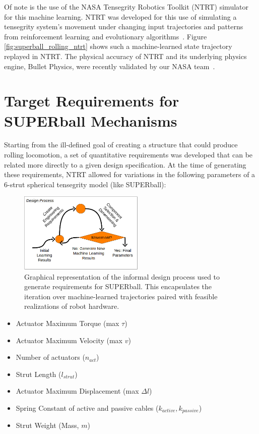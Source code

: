 \documentclass[12pt]{report}
\begin{document}
Of note is the use of the NASA Tensegrity Robotics Toolkit (NTRT) simulator for this machine learning. 
NTRT was developed for this use of simulating a tensegrity system's movement under changing input trajectories and patterns from reinforcement learning and evolutionary algorithms~\cite{Tietz2013,mirletz2014design,Caluwaerts2013rsif,Iscen2013,iscen2014flop}.
Figure \ref{fig:superball_rolling_ntrt} shows such a machine-learned state trajectory replayed in NTRT.
The physical accuracy of NTRT and its underlying physics engine, Bullet Physics, were recently validated by our NASA team~\cite{Caluwaerts2013rsif}.

\section{Target Requirements for SUPERball Mechanisms}

Starting from the ill-defined goal of creating a structure that could produce rolling locomotion, a set of quantitative requirements was developed that can be related more directly to a given design specification.
At the time of generating these requirements, NTRT allowed for variations in the following parameters of a 6-strut spherical tensegrity model (like SUPERball):

\begin{figure}
  \begin{center}
  \vspace{-0.5cm}
    \includegraphics[width=0.53\textwidth]{img/design_process.jpg}
    \caption{Graphical representation of the informal design process used to generate requirements for SUPERball. This encapsulates the iteration over machine-learned trajectories paired with feasible realizations of robot hardware.}
    \label{fig:design_process}
  \end{center}
  \vspace{-0.7cm}
\end{figure}

\begin{itemize}
  \setlength{\itemsep}{0cm}%
  \setlength{\parskip}{0cm}%
  \item Actuator Maximum Torque (max $\tau$)
  \item Actuator Maximum Velocity (max $v$)
  \item Number of actuators ($n_{act}$)
  \item Strut Length ($l_{strut}$)
  \item Actuator Maximum Displacement (max $\Delta l$)
  \item Spring Constant of active and passive cables ($k_{active}, k_{passive}$)
  \item Strut Weight (Mass, $m$)
\end{itemize}
\end{document}
